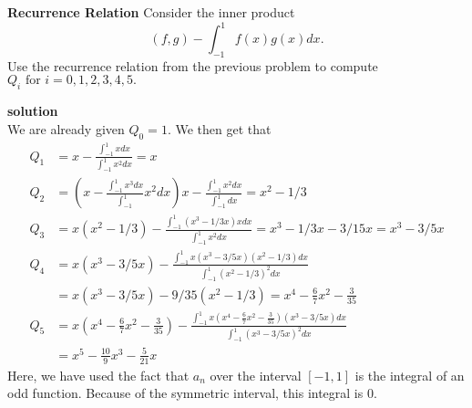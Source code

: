 \textbf{Recurrence Relation} Consider the inner product $$(f, g) - \int_{-1}^1 f(x) g(x) dx.$$ Use the recurrence relation from the previous problem to compute $Q_i \text{ for } i = 0, 1, 2, 3, 4, 5.$

\textbf{solution}\\
We are already given $Q_0 = 1$. We then get that
\begin{align*}
Q_1 &= x - \frac{\int_{-1}^1x dx}{\int_{-1}^1 x^2 dx} = x\\
Q_2 &= (x - \frac{\int_{-1}^1 x^3 dx}{\int_{-1}^1} x^2 dx)x - \frac{\int_{-1}^1 x^2 dx}{\int_{-1}^1 dx} = x^2 - 1/3\\
Q_3 &= x(x^2 - 1/3) - \frac{\int_{-1}^1 (x^3 - 1/3x)x dx}{\int_{-1}^1 x^2 dx} = x^3 - 1/3x - 3/15x = x^3 - 3/5x\\
Q_4 &= x(x^3 - 3/5x) - \frac{\int_{-1}^1 x(x^3 - 3/5x)(x^2 - 1/3)dx} {\int_{-1}^1 (x^2 - 1/3)^2 dx} \\ 
&= x(x^3 - 3/5x) - 9/35(x^2 - 1/3) = x^4- \frac{6}{7}x^2 - \frac{3}{35}\\
Q_5 &= x(x^4- \frac{6}{7}x^2 - \frac{3}{35}) - \frac{\int_{-1}^1 x(x^4- \frac{6}{7}x^2 - \frac{3}{35})(x^3 - 3/5x) dx}{\int_{-1}^1 (x^3 - 3/5x)^2 dx}\\
&= x^5 - \frac{10}{9}x^3 - \frac{5}{21}x
\end{align*}
Here, we have used the fact that $a_n$ over the interval $[-1, 1]$ is the integral of an odd function. Because of the symmetric interval, this integral is 0. 
